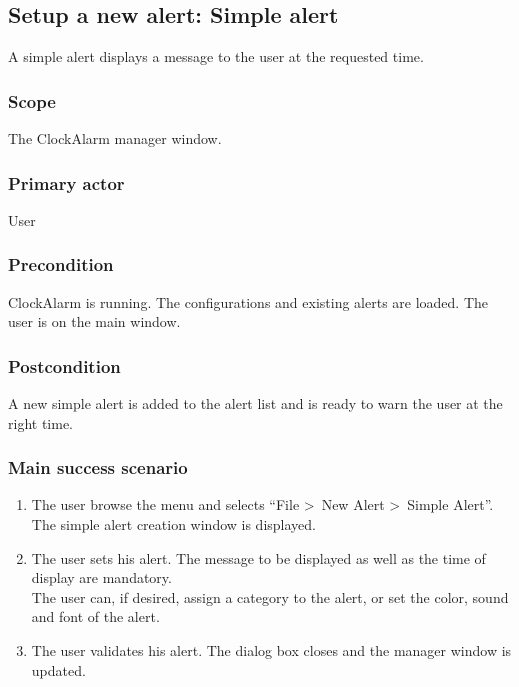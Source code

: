 \subsection{Setup a new alert: Simple alert}
A simple alert displays a message to the user at the requested time.
\subsubsection{Scope}
The ClockAlarm manager window.
\subsubsection{Primary actor}
User
\subsubsection{Precondition}
ClockAlarm is running. The configurations and existing alerts are loaded. The user is on the main window.
\subsubsection{Postcondition}
A new simple alert is added to the alert list and is ready to warn the user at the right time.
\subsubsection{Main success scenario}
\begin{enumerate}
	\item The user browse the menu and selects ``File \textgreater~New Alert \textgreater~Simple Alert''. The simple alert creation window is displayed. 
	\item\label{itm:ucaa_enter_sa} The user sets his alert. The message to be displayed as well as the time of display are mandatory. \\The user can, if desired, assign a category to the alert, or set the color, sound and font of the alert.
	\item\label{itm:ucaa_validate_sa} The user validates his alert. The dialog box closes and the manager window is updated.
\end{enumerate}
